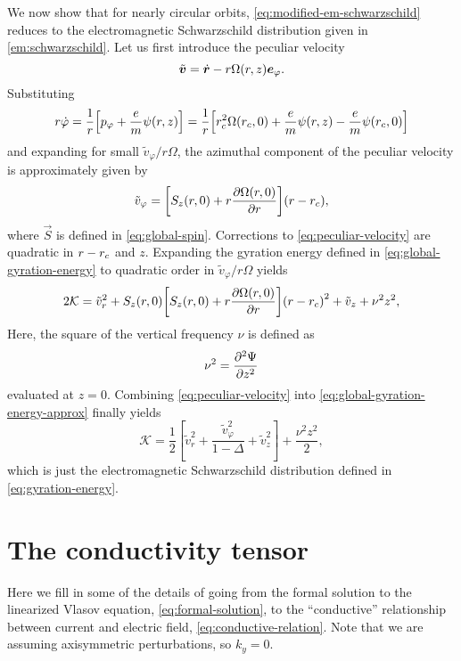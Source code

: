 \documentclass[aps,pre,notitlepage,amsmath,amssymb,amsfonts,nobibnotes,nofootinbib,superscriptaddress]{revtex4-1}
\begin{document}
We now show that for nearly circular orbits,
\cref{eq:modified-em-schwarzschild} reduces to the electromagnetic
Schwarzschild distribution given in \cref{em:schwarzschild}. Let us first
introduce the peculiar velocity
\begin{equation}
  \tilde{\bm{v}} = \dot{\bm{r}} - r\Omega(r,z)\bm{e}_\varphi.
\end{equation}
Substituting
\begin{equation}
  r\dot{\varphi} = \frac{1}{r}\left[p_\varphi + \cm\psi(r,z)\right] =
  \frac{1}{r}\left[\rc^2\Omega(\rc,0) + \cm\psi(r,z) - \cm\psi(\rc,0)\right]
\end{equation}
and expanding for small $\tilde{v}_\varphi/r\Omega$, the azimuthal component
of the peculiar velocity is approximately given by
\begin{equation}
  \label{eq:peculiar-velocity}
  \tilde{v}_\varphi =
  \left[S_z(r,0) + r\pder{\Omega(r,0)}{r}\right](r - \rc),
\end{equation}
where $\vec{S}$ is defined in \cref{eq:global-spin}. Corrections to
\cref{eq:peculiar-velocity} are quadratic in $r-r_c$ and $z$. Expanding the
gyration energy defined in \cref{eq:global-gyration-energy} to quadratic order
in $\tilde{v}_\varphi/r\Omega$ yields
\begin{equation}
  \label{eq:global-gyration-energy-approx}
  2\mathcal{K} = \tilde{v}_r^2
  + S_z(r,0)\left[S_z(r,0) + r\pder{\Omega(r,0)}{r}\right]
  {(r - \rc)}^2 + \tilde{v}_z + \nu^2 z^2,
\end{equation}
Here, the square of the vertical frequency $\nu$ is defined as
\begin{equation}
  \nu^2 = \frac{\partial^2\Psi}{\partial z^2}
\end{equation}
evaluated at $z=0$. Combining \cref{eq:peculiar-velocity} into
\cref{eq:global-gyration-energy-approx} finally yields
\begin{equation}
  \mathcal{K} = \frac{1}{2}\left[
    \tilde{v}_r^2 + \frac{\tilde{v}_\varphi^2}{1 - \Delta} + \tilde{v}_z^2
  \right] + \frac{\nu^2 z^2}{2},
\end{equation}
which is just the electromagnetic Schwarzschild distribution defined in
\cref{eq:gyration-energy}.

\section{The conductivity tensor}
\label{app:conductivity-tensor}

Here we fill in some of the details of going from the formal solution to the
linearized Vlasov equation, \cref{eq:formal-solution}, to the ``conductive''
relationship between current and electric field,
\cref{eq:conductive-relation}. Note that we are assuming axisymmetric
perturbations, so $k_y=0$.
\end{document}
